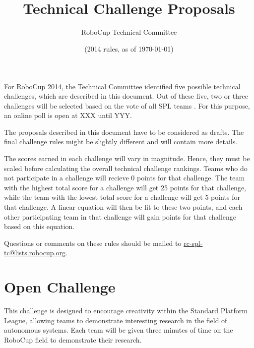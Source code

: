 \documentclass[12pt]{article}
\title{\leaguename \\ Technical Challenge Proposals}
\author{RoboCup Technical Committee}
\date{(2014 rules, as of \today)}
\begin{document}
\maketitle

For RoboCup 2014, the Technical Committee identified five possible technical challenges, which are described in this document. Out of these five, two or three challenges will be selected based on the vote of all SPL teams . For this purpose, an online poll is open at  XXX until  YYY.

The proposals described in this document have to be considered as drafts. The final challenge rules might be slightly different and will contain more details.

The scores earned in each challenge will vary in magnitude.  Hence, they must be scaled before calculating the overall technical challenge rankings.  Teams who do not participate in a challenge will recieve 0 points for that challenge.  The team with the highest total score for a challenge will get 25 points for that challenge, while the team with the lowest total score for a challenge will get 5 points for that challenge.  A linear equation will then be fit to these two points, and each other participating team in that challenge will gain points for that challenge based on this equation. 

Questions or comments on these rules should be mailed to {\small \url{rc-spl-tc@lists.robocup.org}}.

\vfill

\renewcommand\contentsname{Challenges}
\tableofcontents
\setcounter{tocdepth}{1}

\thispagestyle{fancy}

\clearpage

\cfoot{\thepage}
\setcounter{page}{1}






\section{Open Challenge}
\newcommand{\openMinNum}{three}

This challenge is designed to encourage creativity within the Standard 
Platform League, allowing teams to demonstrate interesting research in 
the field of autonomous systems. Each team will be given \openMinNum{} 
minutes of time on the RoboCup field to demonstrate their research.
\end{document}
